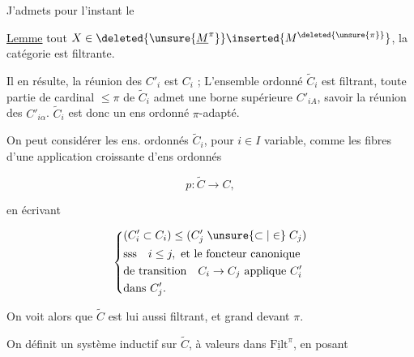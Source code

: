 J'admets pour l'instant le


\uline{Lemme}  tout $X\in\deleted{\unsure{\underline M^\pi}}\inserted{M^{\deleted{\unsure{\pi}}}}$, la catégorie   est filtrante. 

Il en résulte,   la réunion des $C'_i$  est $C_i$ ;  L'ensemble ordonné $\widetilde C_i$ est filtrant,  toute partie  de cardinal $\leq\pi$ de $\widetilde C_i$ admet une borne supérieure $C'_{iA}$, savoir la réunion des $C'_{i\alpha}$. $\widetilde C_i$ est donc un ens ordonné $\pi$-adapté. 

On peut considérer les ens. ordonnés $\widetilde C_i$, pour $i\in I$ variable, comme les fibres d'une application croissante d'ens ordonnés

\[
 p:\widetilde C\longrightarrow C,
\]

en  écrivant

\[
 \left\{\begin{aligned}
 &(C'_i\subset C_i)\leq(C'_j\mathrel{\unsure{\subset|\in}} C_j)\\
 &\text{sss}\quad i\leq j,\ \text{et le foncteur canonique}\\
 &\text{de transition}\quad C_i\to C_j\ \text{applique }C'_i\\
 &\text{dans }C'_j.
 \end{aligned}\right.
\]

On voit alors que $\widetilde C$ est lui aussi filtrant, et grand devant $\pi$.



On définit un système inductif sur $\widetilde C$, à valeurs dans $\underline{\mathrm{Filt}}^{\pi}$, en posant

